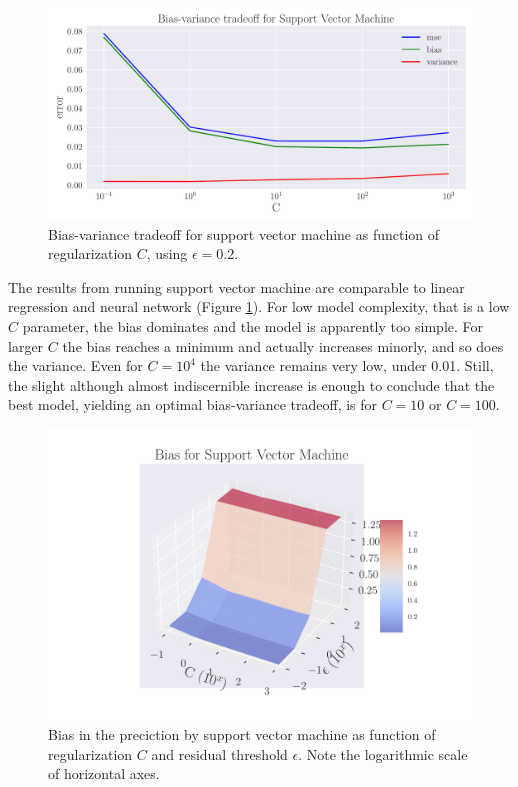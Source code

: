 \documentclass[a4paper]{article}
\begin{document}
	\begin{figure}[h]
		\centering
		\includegraphics[scale=0.5]{../output_extra/plots/bias_var_SVM_C5.pdf}
		\caption{Bias-variance tradeoff for support vector machine as function of regularization $C$, using $\epsilon=0.2$.}
		\label{fig:SVM}
	\end{figure}
	
	The results from running support vector machine are comparable to linear regression and neural network (Figure \ref{fig:SVM}). For low model complexity, that is a low $C$ parameter, the bias dominates and the model is apparently too simple. For larger $C$ the bias reaches a minimum and actually increases minorly, and so does the variance. Even for $C = 10^4$ the variance remains very low, under 0.01. Still, the slight although almost indiscernible increase is enough to conclude that the best model, yielding an optimal bias-variance tradeoff, is for $C=10$ or $C=100$.
	
	\begin{figure}[h]
		\centering
		\includegraphics[scale=0.7]{../output_extra/plots/bias_SVM_C5_eps5.pdf}\hfill
		\caption{Bias in the preciction by support vector machine as function of regularization $C$ and residual threshold $\epsilon$. Note the logarithmic scale of horizontal axes.}
		\label{fig:SVM_3d_bias}
	\end{figure}
\end{document}
